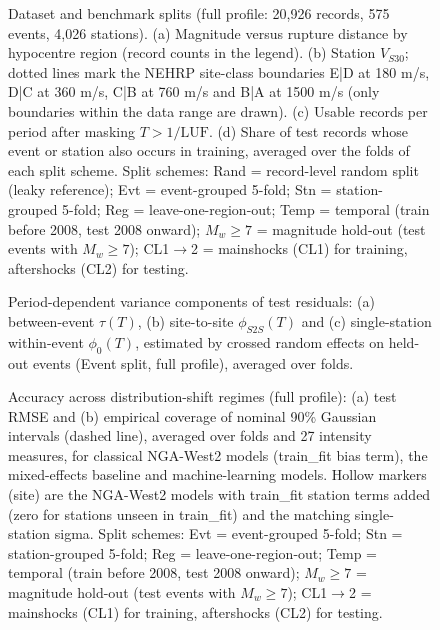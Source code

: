 
\begin{figure}[htbp]
\centering
{}
\caption{Dataset and benchmark splits (full profile: 20,926 records, 575 events, 4,026 stations). (a) Magnitude versus rupture distance by hypocentre region (record counts in the legend). (b) Station $V_{S30}$; dotted lines mark the NEHRP site-class boundaries E|D at 180 m/s, D|C at 360 m/s, C|B at 760 m/s and B|A at 1500 m/s (only boundaries within the data range are drawn). (c) Usable records per period after masking $T > 1/\mathrm{LUF}$. (d) Share of test records whose event or station also occurs in training, averaged over the folds of each split scheme. Split schemes: Rand = record-level random split (leaky reference); Evt = event-grouped 5-fold; Stn = station-grouped 5-fold; Reg = leave-one-region-out; Temp = temporal (train before 2008, test 2008 onward); $M_w{\geq}7$ = magnitude hold-out (test events with $M_w \geq 7$); CL1$\rightarrow$2 = mainshocks (CL1) for training, aftershocks (CL2) for testing.}
\label{fig:fig1_data_splits}
\end{figure}

\begin{figure}[htbp]
\centering
{}
\caption{Period-dependent variance components of test residuals: (a) between-event $\tau(T)$, (b) site-to-site $\phi_{S2S}(T)$ and (c) single-station within-event $\phi_0(T)$, estimated by crossed random effects on held-out events (Event split, full profile), averaged over folds.}
\label{fig:fig2_variance_components}
\end{figure}

\begin{figure}[htbp]
\centering
{}
\caption{Accuracy across distribution-shift regimes (full profile): (a) test RMSE and (b) empirical coverage of nominal 90\% Gaussian intervals (dashed line), averaged over folds and 27 intensity measures, for classical NGA-West2 models (train\_fit bias term), the mixed-effects baseline and machine-learning models. Hollow markers (site) are the NGA-West2 models with train\_fit station terms added (zero for stations unseen in train\_fit) and the matching single-station sigma. Split schemes: Evt = event-grouped 5-fold; Stn = station-grouped 5-fold; Reg = leave-one-region-out; Temp = temporal (train before 2008, test 2008 onward); $M_w{\geq}7$ = magnitude hold-out (test events with $M_w \geq 7$); CL1$\rightarrow$2 = mainshocks (CL1) for training, aftershocks (CL2) for testing.}
\label{fig:fig3_regime_accuracy}
\end{figure}

